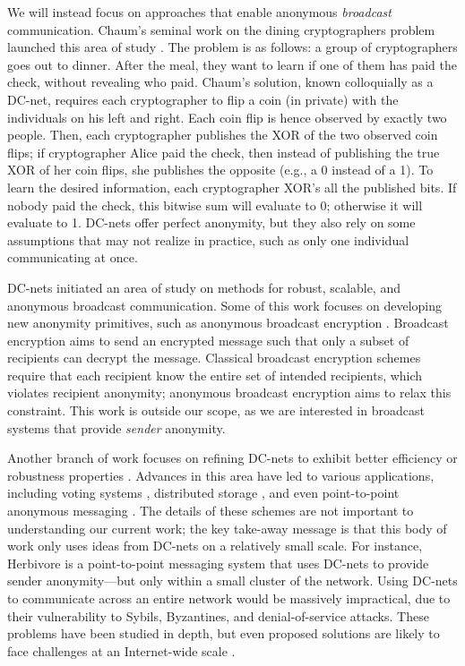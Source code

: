 \documentclass[10pt, twocolumn]{article}
\begin{document}
We will instead focus on approaches that enable anonymous \emph{broadcast} communication.
Chaum's seminal work on the dining cryptographers problem launched this area of study \cite{chaum88}.
The problem is as follows: a group of cryptographers goes out to dinner. After the meal, they want to learn if one of them has paid the check, without revealing who paid.
Chaum's solution, known colloquially as a DC-net, requires each cryptographer to flip a coin (in private) with the individuals on his left and right. Each coin flip is hence observed by exactly two people.
Then, each cryptographer publishes the XOR of the two observed coin flips; if cryptographer Alice paid the check, then instead of publishing the true XOR of her coin flips, she publishes the opposite (e.g., a 0 instead of a 1).
To learn the desired information, each cryptographer XOR's all the published bits. If nobody paid the check, this bitwise sum will evaluate to 0; otherwise it will evaluate to 1.
DC-nets offer perfect anonymity, but they also rely on some assumptions that may not realize in practice, such as only one individual communicating at once.

DC-nets initiated an area of study on methods for robust, scalable, and anonymous broadcast communication. 
Some of this work focuses on developing new anonymity primitives, such as anonymous broadcast encryption \cite{libert2012anonymous, fazio2012outsider}.
Broadcast encryption aims to send an encrypted message such that only a subset of recipients can decrypt the message.
Classical broadcast encryption schemes require that each recipient know the entire set of intended recipients, which violates recipient anonymity; anonymous broadcast encryption aims to relax this constraint. 
This work is outside our scope, as we are interested in broadcast systems that provide \emph{sender} anonymity.


Another branch of work focuses on refining DC-nets to exhibit better efficiency or robustness properties \cite{waidner1989dining,golle2004dining,corrigan2010dissent}.
Advances in this area have led to various applications, including voting systems \cite{fujioka1993practical,van2010anonymous}, distributed storage \cite{freeHavenProject}, and even point-to-point anonymous messaging \cite{goel2003herbivore}.
The details of these schemes are not important to understanding our current work; the key take-away message is that this body of work only uses ideas from DC-nets on a relatively small scale.
For instance, Herbivore \cite{goel2003herbivore} is a point-to-point messaging system that uses DC-nets to provide sender anonymity---but only within a small cluster of the network.
Using DC-nets to communicate across an entire network would be massively impractical, due to their vulnerability to Sybils, Byzantines, and denial-of-service attacks.
These problems have been studied in depth, but even proposed solutions are likely to face challenges at an Internet-wide scale \cite{golle2004dining,corrigan2010dissent}.
\end{document}

